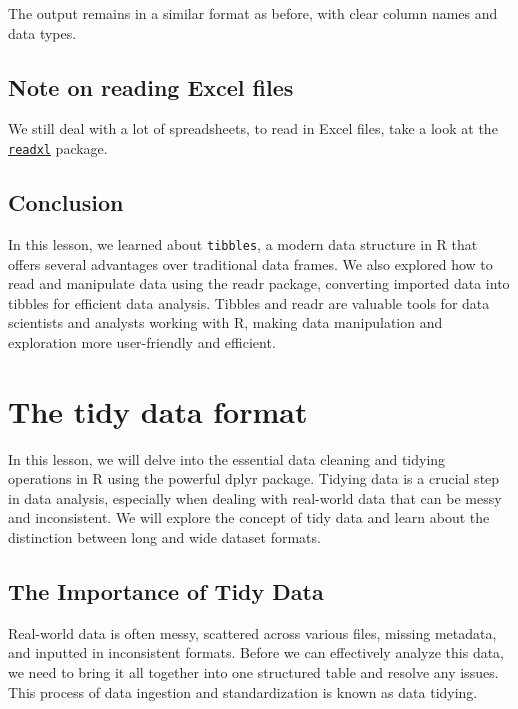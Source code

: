 \documentclass[
]{book}
\begin{document}
The output remains in a similar format as before, with clear column names and data types.

\hypertarget{note-on-reading-excel-files}{%
\subsection{Note on reading Excel files}\label{note-on-reading-excel-files}}

We still deal with a lot of spreadsheets, to read in Excel files, take a look at the \href{https://readxl.tidyverse.org/}{\texttt{readxl}} package.

\hypertarget{conclusion-18}{%
\subsection{Conclusion}\label{conclusion-18}}

In this lesson, we learned about \texttt{tibbles}, a modern data structure in R that offers several advantages over traditional data frames. We also explored how to read and manipulate data using the readr package, converting imported data into tibbles for efficient data analysis. Tibbles and readr are valuable tools for data scientists and analysts working with R, making data manipulation and exploration more user-friendly and efficient.

\hypertarget{the-tidy-data-format}{%
\section{The tidy data format}\label{the-tidy-data-format}}

In this lesson, we will delve into the essential data cleaning and tidying operations in R using the powerful dplyr package. Tidying data is a crucial step in data analysis, especially when dealing with real-world data that can be messy and inconsistent. We will explore the concept of tidy data and learn about the distinction between long and wide dataset formats.

\hypertarget{the-importance-of-tidy-data}{%
\subsection{The Importance of Tidy Data}\label{the-importance-of-tidy-data}}

Real-world data is often messy, scattered across various files, missing metadata, and inputted in inconsistent formats. Before we can effectively analyze this data, we need to bring it all together into one structured table and resolve any issues. This process of data ingestion and standardization is known as data tidying.
\end{document}
